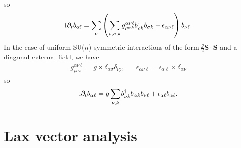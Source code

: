 \documentclass[nofootinbib,twocolumn]{revtex4-2}
\newcommand{\p}[1]{\left(#1\right)} %
\renewcommand{\v}{\bm} %
\renewcommand{\c}{\cdot} %
\renewcommand{\i}{\mathrm{i}\mkern1mu} %
\newcommand{\1}{\mathds{1}}
\begin{document}
so
\begin{align}
  \i \partial_t b_{\alpha\ell}
  = \sum_\nu \p{\sum_{\rho,\sigma,k}
    g^{\alpha\nu\ell}_{\rho\sigma k} b_{\rho k}^\dag b_{\sigma k}
    + \epsilon_{\alpha\nu\ell}} b_{\nu\ell}.
\end{align}
In the case of uniform SU($n$)-symmetric interactions of the form $\frac{g}{2}\v S\c\v S$ and a diagonal external field, we have
\begin{align}
  g^{\alpha\nu\ell}_{\rho\sigma k}
  = g \times \delta_{\alpha\sigma} \delta_{\nu\rho},
  &&
  \epsilon_{\alpha\nu\ell}
  = \epsilon_{\alpha\ell} \times \delta_{\alpha\nu}
\end{align}
so
\begin{align}
  \i \partial_t b_{\alpha\ell}
  = g \sum_{\nu,k} b_{\nu k}^\dag b_{\alpha k} b_{\nu\ell}
  + \epsilon_{\alpha\ell} b_{\alpha\ell}.
\end{align}

\section{Lax vector analysis}
\label{sec:lax}
\end{document}
